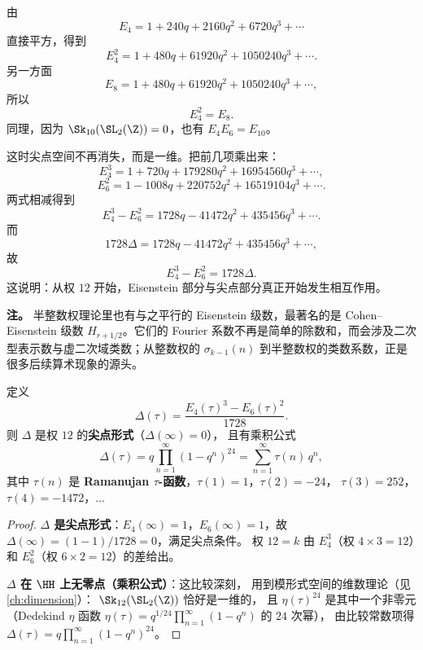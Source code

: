 \begin{example}[从 $q$-展开验证乘积关系]
\label{ex:eisenstein-product-identities}
由
\[
  E_4=1+240q+2160q^2+6720q^3+\cdots
\]
直接平方，得到
\[
  E_4^2=1+480q+61920q^2+1050240q^3+\cdots.
\]
另一方面
\[
  E_8=1+480q+61920q^2+1050240q^3+\cdots,
\]
所以
\[
  E_4^2=E_8.
\]
同理，因为 $\Sk_{10}(\SL_2(\Z))=0$，也有 $E_4E_6=E_{10}$。
\end{example}

\begin{example}[权 $12$ 的第一条非平凡关系]
\label{ex:weight12-relation}
这时尖点空间不再消失，而是一维。把前几项乘出来：
\[
  E_4^3=1+720q+179280q^2+16954560q^3+\cdots,
\]
\[
  E_6^2=1-1008q+220752q^2+16519104q^3+\cdots.
\]
两式相减得到
\[
  E_4^3-E_6^2=1728q-41472q^2+435456q^3+\cdots.
\]
而
\[
  1728\Delta=1728q-41472q^2+435456q^3+\cdots,
\]
故
\[
  E_4^3-E_6^2=1728\Delta.
\]
这说明：从权 $12$ 开始，Eisenstein 部分与尖点部分真正开始发生相互作用。
\end{example}

\textbf{注。} 半整数权理论里也有与之平行的 Eisenstein 级数，最著名的是 Cohen--Eisenstein 级数 $H_{r+1/2}$。它们的 Fourier 系数不再是简单的除数和，而会涉及二次型表示数与虚二次域类数；从整数权的 $\sigma_{k-1}(n)$ 到半整数权的类数系数，正是很多后续算术现象的源头。

\begin{proposition}[$E_4, E_6$ 与 $\Delta$]
\label{prop:E4-E6-Delta}
定义
\[
  \Delta(\tau) = \frac{E_4(\tau)^3 - E_6(\tau)^2}{1728}.
\]
则 $\Delta$ 是权 $12$ 的\textbf{尖点形式}（$\Delta(\infty) = 0$），
且有乘积公式
\[
  \Delta(\tau) = q \prod_{n=1}^{\infty}(1-q^n)^{24}
  = \sum_{n=1}^{\infty} \tau(n)\, q^n,
\]
其中 $\tau(n)$ 是 \textbf{Ramanujan $\tau$-函数}，$\tau(1) = 1$，$\tau(2) = -24$，
$\tau(3) = 252$，$\tau(4) = -1472$，$\ldots$
\end{proposition}

\begin{proof}
\textbf{$\Delta$ 是尖点形式}：$E_4(\infty) = 1$，$E_6(\infty) = 1$，故
$\Delta(\infty) = (1 - 1)/1728 = 0$，满足尖点条件。
权 $12 = k$ 由 $E_4^3$（权 $4 \times 3 = 12$）和 $E_6^2$（权 $6 \times 2 = 12$）的差给出。

\textbf{$\Delta$ 在 $\HH$ 上无零点（乘积公式）}：这比较深刻，
用到模形式空间的维数理论（见\cref{ch:dimension}）：
$\Sk_{12}(\SL_2(\Z))$ 恰好是一维的，
且 $\eta(\tau)^{24}$ 是其中一个非零元（Dedekind $\eta$ 函数
$\eta(\tau) = q^{1/24}\prod_{n=1}^\infty(1-q^n)$ 的 $24$ 次幂），
由比较常数项得 $\Delta(\tau) = q\prod_{n=1}^\infty(1-q^n)^{24}$。
\end{proof}

